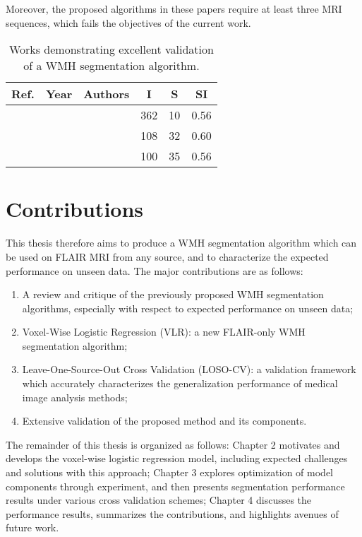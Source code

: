 Moreover, the proposed algorithms in these papers require at least three MRI sequences, which fails the objectives of the current work.
\begin{table}[h]
  \newcommand{\citefortablev}[1]{{\cite{#1}}&{\citeyear{#1}}&{\citeauthor{#1}}}
  \caption{Works demonstrating excellent validation of a WMH segmentation algorithm.}\label{tab:priorworkval}
  \centering
    \begin{tabular}{cclccc}
      \hline
      Ref.&Year&Authors&I&S&SI
      \\\hline
      \citefortablev{Dyrby2008} & 362 & 10 & 0.56 \\
      \citefortablev{Guizard2015} & 108 & 32 & 0.60 \\
      \citefortablev{Harmouche2015} & 100 & 35 & 0.56 \\
      \hline
    \end{tabular}
\end{table}
\section{Contributions}
This thesis therefore aims to produce a WMH segmentation algorithm which can be used on FLAIR MRI from any source, and to characterize the expected performance on unseen data.
The major contributions are as follows:
\begin{enumerate}
  \item A review and critique of the previously proposed WMH segmentation algorithms, especially with respect to expected performance on unseen data;
  \item Voxel-Wise Logistic Regression (VLR): a new FLAIR-only WMH segmentation algorithm;
  \item Leave-One-Source-Out Cross Validation (LOSO-CV): a validation framework which accurately characterizes the generalization performance of medical image analysis methods;
  \item Extensive validation of the proposed method and its components.
\end{enumerate}
The remainder of this thesis is organized as follows:
Chapter 2 motivates and develops the voxel-wise logistic regression model, including expected challenges and solutions with this approach;
Chapter 3 explores optimization of model components through experiment, and then presents segmentation performance results under various cross validation schemes;
Chapter 4 discusses the performance results, summarizes the contributions, and highlights avenues of future work.

